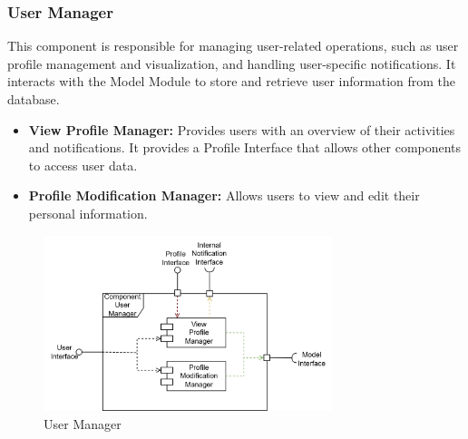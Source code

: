 \subsubsection{User Manager}
This component is responsible for managing user-related operations, such as user profile management and visualization, and handling user-specific 
notifications. It interacts with the Model Module to store and retrieve user information from the database.
\begin{itemize}
    \item \textbf{View Profile Manager:} Provides users with an overview of their activities and notifications. It provides a Profile Interface that
    allows other components to access user data.
    \item \textbf{Profile Modification Manager:} Allows users to view and edit their personal information.
\end{itemize}
\begin{figure}[H]
    \centering
    \includegraphics[width=0.75\textwidth]{Images/Components/user_Component.png}
    \caption{User Manager}\label{fig:user_manager}
\end{figure}

